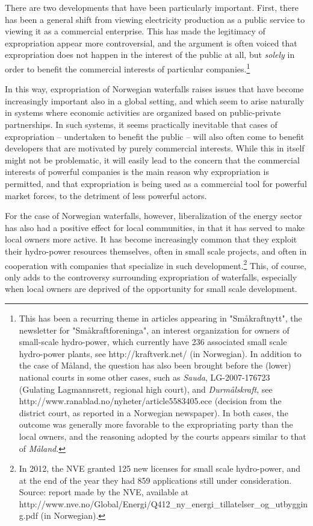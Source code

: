 There are two developments that have been particularly important. First, there has been a general shift from viewing electricity production as a public service to viewing it as a commercial enterprise. This has made the legitimacy of expropriation appear more controversial, and the argument is often voiced that expropriation does not happen in the interest of the public at all, but \emph{solely} in order to benefit the commercial interests of particular companies.\footnote{This has been a recurring theme in articles appearing in "Småkraftnytt", the newsletter for "Småkraftforeninga", an interest organization for owners of small-scale hydro-power, which currently have 236 associated small scale hydro-power plants, see http://kraftverk.net/ (in Norwegian). In addition to the case of Måland, the question has also been brought before the (lower) national courts in some other cases, such as \emph{Sauda}, LG-2007-176723 (Gulating Lagmannsrett, regional high court), and \emph{Durmålskraft}, see http://www.ranablad.no/nyheter/article5583405.ece (decision from the district court, as reported in a Norwegian newspaper). In both cases, the outcome was generally more favorable to the expropriating party than the local owners, and the reasoning adopted by the courts appears similar to that of \emph{Måland}.}

In this way, expropriation of Norwegian waterfalls raises issues that have become increasingly important also in a global setting, and which seem to arise naturally in systems where economic activities are organized based on public-private partnerships. In such systems, it seems practically inevitable that cases of expropriation -- undertaken to benefit the public -- will also often come to benefit developers that are motivated by purely commercial interests. While this in itself might not be problematic, it will easily lead to the concern that the commercial interests of powerful companies is the main reason why expropriation is permitted, and that expropriation is being used as a commercial tool for powerful market forces, to the detriment of less powerful actors.

For the case of Norwegian waterfalls, however, liberalization of the energy sector has also had a positive effect for local communities, in that it has served to make local owners more active. It has become increasingly common that they exploit their hydro-power resources themselves, often in small scale projects, and often in cooperation with companies that specialize in such development.\footnote{In 2012, the NVE granted 125 new licenses for small scale hydro-power, and at the end of the year they had 859 applications still under consideration. Source: report made by the NVE, available at http://www.nve.no/Global/Energi/Q412\_ny\_energi\_tillatelser\_og\_utbygging.pdf (in Norwegian). } This, of course, only adds to the controversy surrounding expropriation of waterfalls, especially when local owners are deprived of the opportunity for small scale development.

